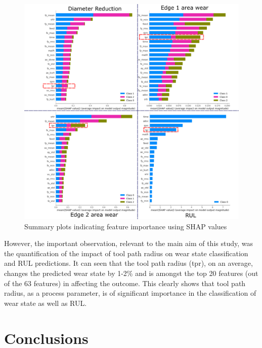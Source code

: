 \documentclass[preprint,review,12pt]{elsarticle}
\begin{document}
\begin{figure}[!h]
  \begin{center}
    \includegraphics[width=\linewidth]{59.png}
    \caption{Summary plots indicating feature importance using SHAP values}\label{fig:fig59}
  \end{center}
\end{figure}

However, the important observation, relevant to the main aim of this study, was the quantification of the impact of tool path radius on wear state classification and RUL predictions. It can seen that the tool path radius (tpr), on an average, changes the predicted wear state by 1-2\% and is amongst the top 20 features (out of the 63 features) in affecting the outcome. This clearly shows that tool path radius, as a process parameter, is of significant importance in the classification of wear state as well as RUL.
\fi

\section{Conclusions}\label{chap:conc}
\end{document}
